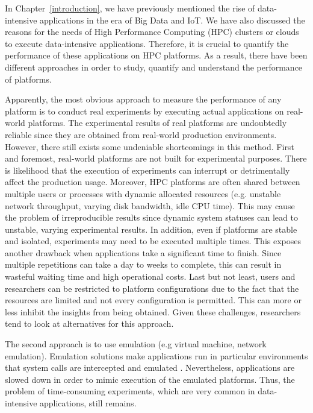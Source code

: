 In Chapter~\ref{introduction}, we have previously mentioned the 
rise of data-intensive applications in the era of Big Data and IoT.
We have also discussed the reasons for the needs of High Performance 
Computing (HPC) clusters or clouds to execute data-intensive applications.
Therefore, it is crucial to quantify the performance of these applications 
on HPC platforms. As a result, there have been different approaches 
in order to study, quantify and understand the performance of platforms.

Apparently, the most obvious approach to measure the performance 
of any platform is to conduct real experiments by executing actual 
applications on real-world platforms. 
The experimental results of real platforms are undoubtedly reliable 
since they are obtained from real-world production environments. 
However, there still exists some undeniable shortcomings in this method. 
First and foremost, real-world platforms are not built for experimental purposes. 
There is likelihood that the execution of experiments can interrupt 
or detrimentally affect the production usage. 
Moreover, HPC platforms are often shared between multiple users or processes 
with dynamic allocated resources (e.g. unstable network throughput,  
varying disk bandwidth, idle CPU time). 
This may cause the problem of irreproducible results since dynamic 
system statuses can lead to unstable, varying experimental results. 
In addition, even if platforms are stable and isolated, experiments may need 
to be executed multiple times. 
This exposes another drawback when applications take a significant time 
to finish. Since multiple repetitions can take a day to weeks to complete, 
this can result in wasteful waiting time and high operational costs.  
Last but not least, users and researchers can be restricted to platform 
configurations due to the fact that the resources are limited and 
not every configuration is permitted. This can more or less inhibit 
the insights from being obtained. 
Given these challenges, researchers tend to look at alternatives 
for this approach. 

The second approach is to use emulation (e.g virtual machine, 
network emulation). Emulation solutions make applications run 
in particular environments that system calls are intercepted 
and emulated \cite{casanova2008simgrid}. 
Nevertheless, applications are slowed down in order to mimic 
execution of the emulated platforms. 
Thus, the problem of time-consuming experiments, 
which are very common in data-intensive applications, still remains. 

